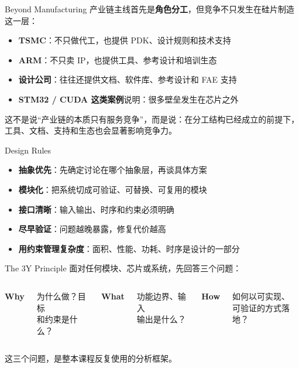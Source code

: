 \documentclass[aspectratio=169]{beamer}
\begin{document}
\begin{frame}{Beyond Manufacturing}
\small
产业链主线首先是\textbf{角色分工}，但竞争不只发生在硅片制造这一层：
\begin{itemize}
  \item \textbf{TSMC}：不只做代工，也提供 PDK、设计规则和技术支持
  \item \textbf{ARM}：不只卖 IP，也提供工具、参考设计和培训生态
  \item \textbf{设计公司}：往往还提供文档、软件库、参考设计和 FAE 支持
  \item \textbf{STM32 / CUDA 这类案例}说明：很多壁垒发生在芯片之外
\end{itemize}

\vspace{0.5em}
\footnotesize
这不是说``产业链的本质只有服务竞争''，而是说：在分工结构已经成立的前提下，工具、文档、支持和生态也会显著影响竞争力。
\end{frame}

\begin{frame}{Design Rules}
\begin{itemize}
  \item \textbf{抽象优先}：先确定讨论在哪个抽象层，再谈具体方案
  \item \textbf{模块化}：把系统切成可验证、可替换、可复用的模块
  \item \textbf{接口清晰}：输入输出、时序和约束必须明确
  \item \textbf{尽早验证}：问题越晚暴露，修复代价越高
  \item \textbf{用约束管理复杂度}：面积、性能、功耗、时序是设计的一部分
\end{itemize}
\end{frame}

\begin{frame}{The 3Y Principle}
\small
面对任何模块、芯片或系统，先回答三个问题：

\vspace{0.6em}
\begin{columns}[T]
  \centering
  \textbf{\large Why}

  \vspace{0.4em}
  \footnotesize 为什么做？目标\\和约束是什么？

  \centering
  \textbf{\large What}

  \vspace{0.4em}
  \footnotesize 功能边界、输入\\输出是什么？

  \centering
  \textbf{\large How}

  \vspace{0.4em}
  \footnotesize 如何以可实现、\\可验证的方式落地？
\end{columns}

\vspace{0.8em}
这三个问题，是整本课程反复使用的分析框架。
\end{frame}
\end{document}
